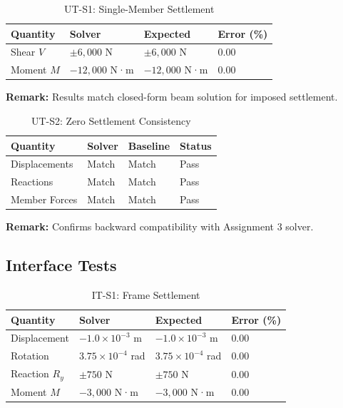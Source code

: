 \begin{table}[H]
\centering
\caption{UT-S1: Single-Member Settlement}
\begin{tabular}{llll}
\toprule
Quantity & Solver & Expected & Error (\%) \\
\midrule
Shear $V$ & $\pm 6{,}000$ N & $\pm 6{,}000$ N & 0.00 \\
Moment $M$ & $-12{,}000$ N·m & $-12{,}000$ N·m & 0.00 \\
\bottomrule
\end{tabular}
\end{table}

\textbf{Remark:} Results match closed-form beam solution for imposed settlement.

\vspace{0.4cm}

\begin{table}[H]
\centering
\caption{UT-S2: Zero Settlement Consistency}
\begin{tabular}{llll}
\toprule
Quantity & Solver & Baseline & Status \\
\midrule
Displacements & Match & Match & Pass \\
Reactions & Match & Match & Pass \\
Member Forces & Match & Match & Pass \\
\bottomrule
\end{tabular}
\end{table}

\textbf{Remark:} Confirms backward compatibility with Assignment 3 solver.

\subsection{Interface Tests}

\begin{table}[H]
\centering
\caption{IT-S1: Frame Settlement}
\begin{tabular}{llll}
\toprule
Quantity & Solver & Expected & Error (\%) \\
\midrule
Displacement & $-1.0 \times 10^{-3}$ m & $-1.0 \times 10^{-3}$ m & 0.00 \\
Rotation & $3.75 \times 10^{-4}$ rad & $3.75 \times 10^{-4}$ rad & 0.00 \\
Reaction $R_y$ & $\pm 750$ N & $\pm 750$ N & 0.00 \\
Moment $M$ & $-3{,}000$ N·m & $-3{,}000$ N·m & 0.00 \\
\bottomrule
\end{tabular}
\end{table}

